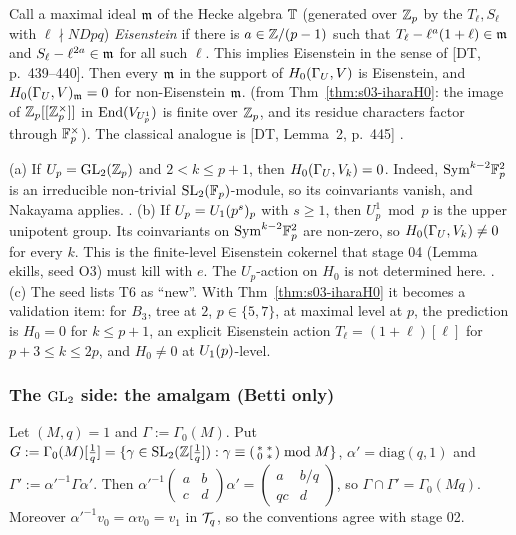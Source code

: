 \begin{corollary}\label{cor:s03-eis}
Call a maximal ideal $\mathfrak{m}$ of the Hecke algebra $\mathbb{T}$ (generated over $\mathbb{Z}_p$ by the $T_\ell,S_\ell$ with $\ell\nmid NDpq$) \emph{Eisenstein}
if there is $a\in\mathbb{Z}/(p-1)$ such that $T_\ell-\ell^a(1+\ell)\in\mathfrak{m}$ and $S_\ell-\ell^{2a}\in\mathfrak{m}$ for all such $\ell$. This implies
Eisenstein in the sense of [DT, p.~439--440]. Then every $\mathfrak{m}$ in the support of $H_0(\Gamma_U,V)$ is Eisenstein, and
$H_0(\Gamma_U,V)_{\mathfrak{m}}=0$ for non-Eisenstein $\mathfrak{m}$. \sttoprove{} (from Thm~\ref{thm:s03-iharaH0}: the image of $\mathbb{Z}_p[[\mathbb{Z}_p^\times]]$ in
$\operatorname{End}(V_{U^1_p})$ is finite over $\mathbb{Z}_p$, and its residue characters factor through $\mathbb{F}_p^\times$). The classical analogue is [DT,
Lemma~2, p.~445] \stcited{} .
\end{corollary}

\begin{remark}\label{rem:s03-T6}
(a) If $U_p=\mathrm{GL}_2(\mathbb{Z}_p)$ and $2<k\le p+1$, then $H_0(\Gamma_U,V_k)=0$. Indeed, $\mathrm{Sym}^{k-2}\mathbb{F}_p^2$ is an irreducible non-trivial
$\mathrm{SL}_2(\mathbb{F}_p)$-module, so its coinvariants vanish, and Nakayama applies. \sttoprove.
(b) If $U_p=U_1(p^s)_p$ with $s\ge1$, then $U^1_p\bmod p$ is the upper unipotent group. Its coinvariants on $\mathrm{Sym}^{k-2}\mathbb{F}_p^2$ are
non-zero, so $H_0(\Gamma_U,V_k)\ne0$ for every $k$. This is the finite-level Eisenstein cokernel that stage 04 (Lemma ekills, seed O3)
must kill with $e$. The $U_p$-action on $H_0$ is not determined here. \sttoprove.
(c) The seed lists T6 as ``new''. With Thm~\ref{thm:s03-iharaH0} it becomes a validation item: for $B_3$, tree at $2$,
$p\in\{5,7\}$, at maximal level at $p$, the prediction is $H_0=0$ for $k\le p+1$, an explicit Eisenstein action
$T_\ell=(1+\ell)[\ell]$ for $p+3\le k\le 2p$, and $H_0\ne0$ at $U_1(p)$-level.
\end{remark}

\subsubsection{The $\mathrm{GL}_2$ side: the amalgam (Betti only)}\label{ss:s03-amalgam}
Let $(M,q)=1$ and $\Gamma:=\Gamma_0(M)$. Put $G:=\Gamma_0(M)[\frac1q]=\{\gamma\in\mathrm{SL}_2(\mathbb{Z}[\frac1q]):\gamma\equiv(\begin{smallmatrix}*&*\\0&*\end{smallmatrix})\bmod M\}$,
$\alpha'=\mathrm{diag}(q,1)$ and $\Gamma':=\alpha'^{-1}\Gamma\alpha'$. Then
$\alpha'^{-1}(\begin{smallmatrix}a&b\\c&d\end{smallmatrix})\alpha'=(\begin{smallmatrix}a&b/q\\qc&d\end{smallmatrix})$, so
$\Gamma\cap\Gamma'=\Gamma_0(Mq)$. Moreover $\alpha'^{-1}v_0=\alpha v_0=v_1$ in $\mathcal{T}_q$, so the conventions agree with stage 02.

